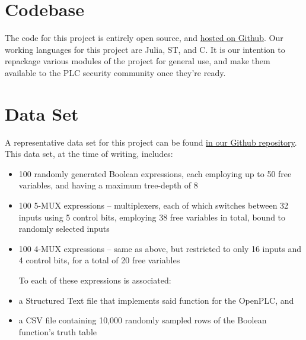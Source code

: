 \documentclass[11pt]{article}
\begin{document}
\section{Codebase}
\label{sec:org80de699}

The code for this project is entirely open source, and \href{https://github.com/oblivia-simplex/refusr}{hosted on Github}. Our working languages for this project are Julia, ST, and C. It is our intention to repackage various modules of the project for general use, and make them available to the PLC security community once they're ready.


\section{Data Set}
\label{sec:org9befe20}

A representative data set for this project can be found \href{https://github.com/oblivia-simplex/refusr/blob/main/Refusr/milestone2\_samples.tgz}{in our Github repository}. This data set, at the time of writing, includes:

\begin{itemize}
\item 100 randomly generated Boolean expressions, each employing up to 50 free variables, and having a maximum tree-depth of 8
\item 100 5-MUX expressions -- multiplexers, each of which switches between 32 inputs using 5 control bits, employing 38 free variables in total, bound to randomly selected inputs
\item 100 4-MUX expressions -- same as above, but restricted to only 16 inputs and 4 control bits, for a total of 20 free variables

To each of these expressions is associated:

\item a Structured Text file that implements said function for the OpenPLC, and
\item a CSV file containing 10,000 randomly sampled rows of the Boolean function's truth table
\end{itemize}
\end{document}
